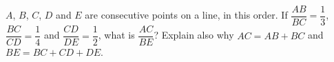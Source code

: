 $A$, $B$, $C$, $D$ and $E$ are consecutive points on a line, in this order. If $\dfrac{AB}{BC}=\dfrac{1}{3}$, $\dfrac{BC}{CD}=\dfrac{1}{4}$ and $\dfrac{CD}{DE}=\dfrac{1}{2}$, what is $\dfrac{AC}{BE}$? Explain also why $AC=AB+BC$ and $BE=BC+CD+DE$.
